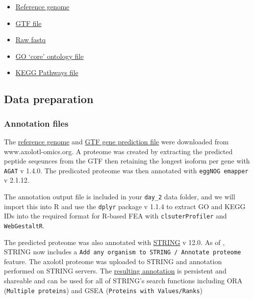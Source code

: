 \documentclass[
]{book}
\providecommand{\tightlist}{%
  \setlength{\itemsep}{0pt}\setlength{\parskip}{0pt}}
\begin{document}
\begin{itemize}
\tightlist
\item
  \href{https://www.axolotl-omics.org/dl/AmexG_v6.0-DD.fa.gz}{Reference genome}
\item
  \href{https://www.axolotl-omics.org/dl/AmexT_v47-AmexG_v6.0-DD.gtf.gz}{GTF file}
\item
  \href{https://www.ncbi.nlm.nih.gov/bioproject/PRJNA300706}{Raw fastq}
\item
  \href{https://purl.obolibrary.org/obo/go.obohea}{GO `core' ontology file}
\item
  \href{https://www.pathway.jp/en/academic.html}{KEGG Pathways file}
\end{itemize}

\hypertarget{data-preparation}{%
\subsection{Data preparation}\label{data-preparation}}

\hypertarget{annotation-files}{%
\subsubsection{Annotation files}\label{annotation-files}}

The \href{https://www.axolotl-omics.org/dl/AmexG_v6.0-DD.fa.gz}{reference genome} and \href{https://www.axolotl-omics.org/dl/AmexT_v47-AmexG_v6.0-DD.gtf.gz}{GTF gene prediction file} were downloaded from www.axolotl-omics.org. A proteome was created by extracting the predicted peptide seqeunces from the GTF then retaining the longest isoform per gene with \texttt{AGAT} v 1.4.0. The predicated proteome was then annotated with \texttt{eggNOG\ emapper} v 2.1.12.

The annotation output file is included in your \texttt{day\_2} data folder, and we will import this into R and use the \texttt{dplyr} package v 1.1.4 to extract GO and KEGG IDs into the required format for R-based FEA with \texttt{clsuterProfiler} and \texttt{WebGestaltR}.

The predicted proteome was also annotated with \href{https://string-db.org/}{STRING} v 12.0. As of , STRING now includes a \texttt{Add\ any\ organism\ to\ STRING\ /\ Annotate\ proteome} feature. The axolotl proteome was uploaded to STRING and annotation performed on STRING servers. The \href{https://version-12-0.string-db.org/organism/STRG0A90SNX}{resulting annotation} is persistent and shareable and can be used for all of STRING's search functions including ORA (\texttt{Multiple\ proteins}) and GSEA (\texttt{Proteins\ with\ Values/Ranks})
\end{document}
